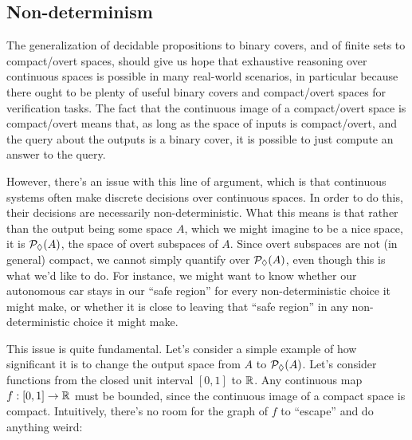 \subsection{Non-determinism}

The generalization of decidable propositions to binary covers, and of finite sets to compact/overt spaces, should give us hope that exhaustive reasoning over continuous spaces is possible in many real-world scenarios, in particular because there ought to be plenty of useful binary covers and compact/overt spaces for verification tasks. The fact that the continuous image of a compact/overt space is compact/overt means that, as long as the space of inputs is compact/overt, and the query about the outputs is a binary cover, it is possible to just compute an answer to the query.

However, there's an issue with this line of argument, which is that continuous systems often make discrete decisions over continuous spaces. In order to do this, their decisions are necessarily non-deterministic. What this means is that rather than the output being some space $A$, which we might imagine to be a nice space, it is $\mathcal{P}_\lozenge(A)$, the space of overt subspaces of $A$. Since overt subspaces are not (in general) compact, we cannot simply quantify over $\mathcal{P}_\lozenge(A)$, even though this is what we'd like to do. For instance, we might want to know whether our autonomous car stays in our ``safe region'' for every non-deterministic choice it might make, or whether it is close to leaving that ``safe region'' in any non-deterministic choice it might make.

This issue is quite fundamental. Let's consider a simple example of how significant it is to change the output space from $A$ to $\mathcal{P}_\lozenge(A)$. Let's consider functions from the closed unit interval $[0,1]$ to $\mathbb{R}$. Any continuous map $f : [0,1] \to \mathbb{R}$ must be bounded, since the continuous image of a compact space is compact. Intuitively, there's no room for the graph of $f$ to ``escape'' and do anything weird:

\begin{center}
\end{center}

